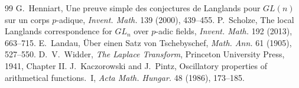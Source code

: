 \documentclass[11pt]{article}
\begin{document}
\begin{thebibliography}{99}
 G.~Henniart, Une preuve simple des conjectures de Langlands pour $GL(n)$ sur un corps $p$-adique, \emph{Invent. Math.} 139 (2000), 439--455.
 P.~Scholze, The local Langlands correspondence for $GL_n$ over $p$-adic fields, \emph{Invent. Math.} 192 (2013), 663--715.
 E.~Landau, Über einen Satz von Tschebyschef, \emph{Math. Ann.} 61 (1905), 527--550.
 D.~V.~Widder, \emph{The Laplace Transform}, Princeton University Press, 1941, Chapter II.
 J.~Kaczorowski and J.~Pintz, Oscillatory properties of arithmetical functions.~I, \emph{Acta Math. Hungar.} 48 (1986), 173--185.
\end{thebibliography}
\end{document}
